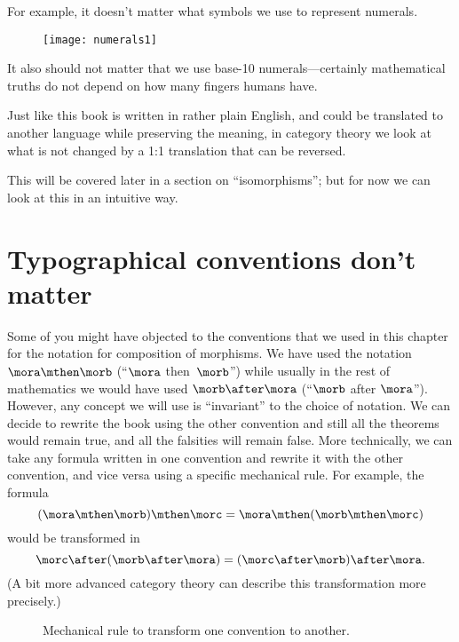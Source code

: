 For example, it doesn't matter what symbols we use to represent numerals.
%
\begin{figure}[h!]
    \texttt{[image: numerals1]}
\end{figure}
%
It also should not matter that we use base-10 numerals---certainly mathematical truths do not depend on how many fingers humans have.

Just like this book is written in rather plain English, and could be translated to another language while preserving the meaning, in category theory we look at what is not changed by a 1:1 translation that can be reversed.

This will be covered later in a section on ``isomorphisms''; but for now we can look at this in an intuitive way.

\section[Typographical conventions]{Typographical conventions don't matter}

Some of you might have objected to the conventions that we used in this chapter for the notation for composition of morphisms.
We have used the notation $\mora \mthen \morb$ (``$\mora$ then~$\morb$'') while usually in the rest of mathematics we would have used $\morb \after \mora$ (``$\morb$ after $\mora$'').
However, any concept we will use is ``invariant'' to the choice of notation.
We can decide to rewrite the book using the other convention and still all the theorems would remain true, and all the falsities will remain false.
More technically, we can take any formula written in one convention and rewrite it with the other convention, and vice versa using a specific mechanical rule.
For example, the formula
%
\begin{equation}
    (\mora \mthen \morb)
    \mthen \morc = \mora \mthen (\morb \mthen \morc)
\end{equation}
%
would be transformed in
%
\begin{equation}
    \morc \after (\morb \after \mora) = (\morc \after \morb) \after \mora.
\end{equation}
(A bit more advanced category theory can describe this transformation more precisely.)

\begin{figure*}[h]
    \hfill
    \caption{Mechanical rule to transform one convention to another.}
\end{figure*}

